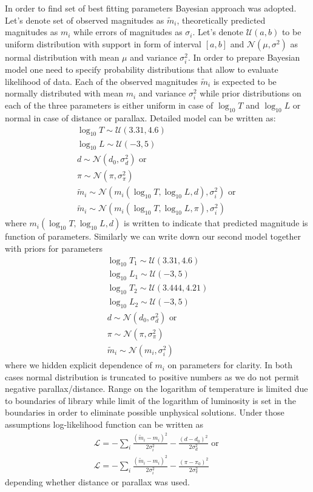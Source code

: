 \documentclass{pracalicmgr}
\begin{document}
In order to find set of best fitting parameters Bayesian approach was adopted. Let's denote set of observed magnitudes as $\tilde{m}_i$, theoretically predicted
magnitudes as $m_i$ while errors of magnitudes as $\sigma_i$. Let's denote $\mathcal{U}(a,b)$ to be uniform distribution with support in form of interval $[a,b]$ and $\mathcal{N}(\mu,\sigma^2)$ as
normal distribution with mean $\mu$ and variance $\sigma_i^2$. In order to prepare Bayesian model one need to specify probability distributions that allow to evaluate likelihood of 
data. Each of the observed magnitudes $\tilde{m}_i$ is expected to be normally distributed with mean $m_i$ and variance $\sigma_i^2$ while prior distributions on each of the three parameters
is either uniform in case of $\log_{10} T$ and $\log_{10} L$ or normal in case of distance or parallax. Detailed model can be written as:
\begin{align}
    \log_{10}{T}\sim \mathcal{U}(3.31,4.6)\\
    \log_{10}{L} \sim \mathcal{U}(-3,5)\\
    d \sim \mathcal{N}(d_0,\sigma_d^2) \textrm{ or } \\
    \pi \sim \mathcal{N} (\pi,\sigma_{\pi}^2)\\
    \tilde{m}_i\sim \mathcal{N}(m_i(\log_{10} T, \log_{10} L, d ),\sigma_i^2) \textrm{ or }\\
    \tilde{m}_i\sim \mathcal{N}(m_i(\log_{10} T, \log_{10} L, \pi ),\sigma_i^2)
\end{align}
where  $m_i(\log_{10} T, \log_{10} L, d )$ is written to indicate that predicted magnitude is function of parameters. 
Similarly we can write down our second model together with priors for parameters
\begin{align}
    \log_{10}{T_1}\sim \mathcal{U}(3.31,4.6)\\
    \log_{10}{L_1} \sim \mathcal{U}(-3,5)\\
    \log_{10}{T_2}\sim \mathcal{U}(3.444,4.21)\\
    \log_{10}{L_2} \sim \mathcal{U}(-3,5)\\
    d \sim \mathcal{N}(d_0,\sigma_d^2) \textrm{ or } \\
    \pi \sim \mathcal{N} (\pi,\sigma_{\pi}^2)\\
    \tilde{m}_i\sim \mathcal{N}(m_i,\sigma_i^2)
\end{align}
where we hidden explicit dependence of $m_i$ on parameters for clarity. In both cases normal distribution is truncated to positive numbers as we do 
not permit negative parallax/distance. Range on the logarithm of temperature is limited due to boundaries of library while limit of the logarithm of luminosity is 
set in the boundaries in order to eliminate possible unphysical solutions.
Under those assumptions log-likelihood function can be written as 
\begin{align}
    \mathcal{L}=-\sum_i\frac{(\tilde{m}_i-m_i)^2}{2\sigma_i^2}-\frac{(d-d_0)^2}{2\sigma_d^2} \textrm{ or }\\
    \mathcal{L}=-\sum_i\frac{(\tilde{m}_i-m_i)^2}{2\sigma_i^2}-\frac{(\pi-\pi_0)^2}{2\sigma_{\pi}^2}
\end{align} depending whether distance or parallax was used. 
\end{document}
